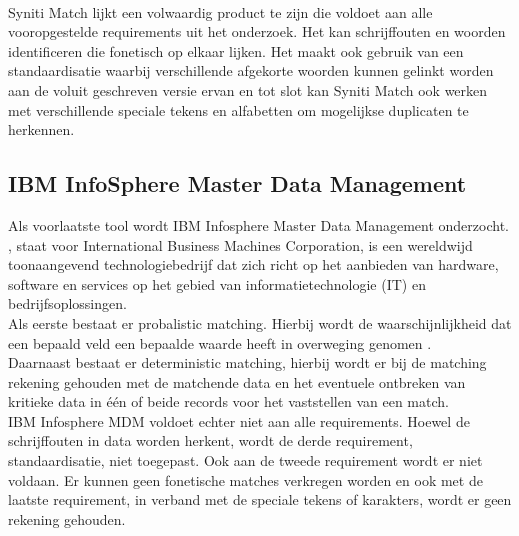 \\Syniti Match lijkt een volwaardig product te zijn die voldoet aan alle vooropgestelde requirements uit het onderzoek. Het kan schrijffouten en woorden identificeren die fonetisch op elkaar lijken. Het maakt ook gebruik van een standaardisatie waarbij verschillende afgekorte woorden kunnen gelinkt worden aan de voluit geschreven versie ervan en tot slot kan Syniti Match ook werken met verschillende speciale tekens en alfabetten om mogelijkse duplicaten te herkennen.

\subsection{IBM InfoSphere Master Data Management}
Als voorlaatste tool wordt IBM Infosphere Master Data Management onderzocht. 
\textcite{IBMAbout}, staat voor International Business Machines Corporation, is een wereldwijd toonaangevend technologiebedrijf dat zich richt op het aanbieden van hardware, software en services op het gebied van informatietechnologie (IT) en bedrijfsoplossingen.
\\Als eerste bestaat er probalistic matching.  Hierbij wordt de waarschijnlijkheid dat een bepaald veld een bepaalde waarde heeft in overweging genomen \autocite{IBMMatching}.
\\Daarnaast bestaat er deterministic matching, hierbij wordt er bij de matching rekening gehouden met de matchende data en het eventuele ontbreken van kritieke data in één of beide records voor het vaststellen van een match. 
\\IBM Infosphere MDM voldoet echter niet aan alle requirements. Hoewel de schrijffouten in data worden herkent, wordt de derde requirement, standaardisatie, niet toegepast. Ook aan de tweede requirement wordt er niet voldaan. Er kunnen geen fonetische matches verkregen worden en ook met de laatste requirement, in verband met de speciale tekens of karakters, wordt er geen rekening gehouden.

